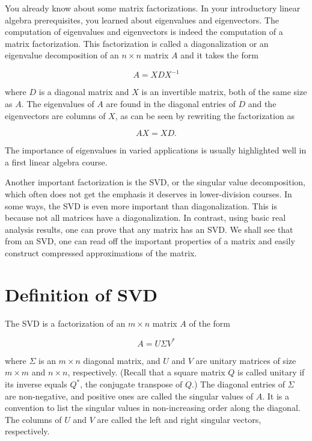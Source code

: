 \documentclass{ximera}
\begin{document}
\begin{problem}
You already know about some matrix factorizations. In your introductory linear algebra prerequisites, you learned about eigenvalues and eigenvectors. The computation of eigenvalues and eigenvectors is indeed the computation of a matrix factorization. This factorization is called a diagonalization or an eigenvalue decomposition of an \( n \times n \) matrix \( A \) and it takes the form

\[
A = X D X^{-1}
\]

where \( D \) is a diagonal matrix and \( X \) is an invertible matrix, both of the same size as \( A \). The eigenvalues of \( A \) are found in the diagonal entries of \( D \) and the eigenvectors are columns of \( X \), as can be seen by rewriting the factorization as

\[
A X = X D.
\]

The importance of eigenvalues in varied applications is usually highlighted well in a first linear algebra course.

Another important factorization is the SVD, or the singular value decomposition, which often does not get the emphasis it deserves in lower-division courses. In some ways, the SVD is even more important than diagonalization. This is because not all matrices have a diagonalization. In contrast, using basic real analysis results, one can prove that any matrix has an SVD. We shall see that from an SVD, one can read off the important properties of a matrix and easily construct compressed approximations of the matrix.

\section{Definition of SVD}

The SVD is a factorization of an \( m \times n \) matrix \( A \) of the form

\[
A = U \Sigma V^*
\]

where \( \Sigma \) is an \( m \times n \) diagonal matrix, and \( U \) and \( V \) are unitary matrices of size \( m \times m \) and \( n \times n \), respectively. (Recall that a square matrix \( Q \) is called unitary if its inverse equals \( Q^* \), the conjugate transpose of \( Q \).) The diagonal entries of \( \Sigma \) are non-negative, and positive ones are called the singular values of \( A \). It is a convention to list the singular values in non-increasing order along the diagonal. The columns of \( U \) and \( V \) are called the left and right singular vectors, respectively.


\end{problem}
\end{document}

